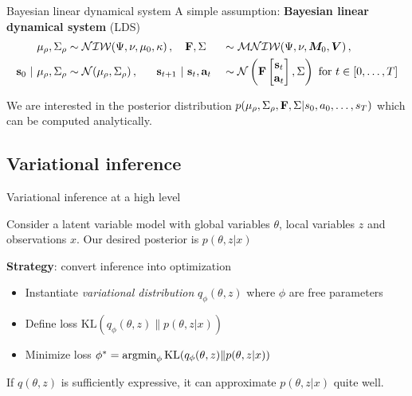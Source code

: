 \documentclass[10pt, compress]{beamer}
\begin{document}
\begin{frame}{Bayesian linear dynamical system}
  A simple assumption: \textbf{Bayesian linear dynamical system} (LDS)
  \begin{alignat*}{3}
    \mu_{\rho},\Sigma_{\rho}&\sim\mathcal{NIW}(\Psi,\nu,\mu_0,\kappa)\,,~~~\mathbf{F},\Sigma&&\sim\mathcal{MNIW}(\Psi,\nu,\bm{M}_0,\bm{V})\,,\\
    \mathbf{s}_0~|~\mu_{\rho},\Sigma_{\rho}&\sim\mathcal{N}(\mu_{\rho}, \Sigma_{\rho})\,,~~~~~\mathbf{s}_{t+1}~|~\mathbf{s}_t,\mathbf{a}_t&&\sim\mathcal{N}\left(\mathbf{F}\begin{bmatrix}\mathbf{s}_t\\\mathbf{a}_t\end{bmatrix},\Sigma\right) \textrm{ for } t \in [0,\ldots,T]
  \end{alignat*}
  \pause
  \centering
  

  \pause
  We are interested in the posterior distribution 
  $
  p(\mu_\rho, \Sigma_\rho, \mathbf{F}, \Sigma | {s_0, a_0, \ldots, s_T})
  $
  which can be computed analytically.
\end{frame}

\subsection{Variational inference}
\begin{frame}{Variational inference at a high level}

  \pause
    Consider a latent variable model with global variables
    $\theta$, local variables $z$ and observations $x$. Our desired
    posterior is $p(\theta, z | x)$

    \pause
    \textbf{Strategy}: convert inference into optimization
    \begin{itemize}
        \pause
      \item Instantiate \emph{variational distribution} $q_\phi(\theta, z)$
        where $\phi$ are free parameters
        \pause
      \item Define loss $\textrm{KL}(q_\phi(\theta, z)\|p(\theta, z | x))$
        \pause
      \item Minimize loss $\phi^* = \operatorname*{argmin}_\phi \textrm{KL}(q_\phi(\theta, z)\|p(\theta, z | x))$
    \end{itemize}
    \pause
    If $q(\theta, z)$ is sufficiently expressive,
    it can approximate $p(\theta, z | x)$ quite well.
\end{frame}
\end{document}
